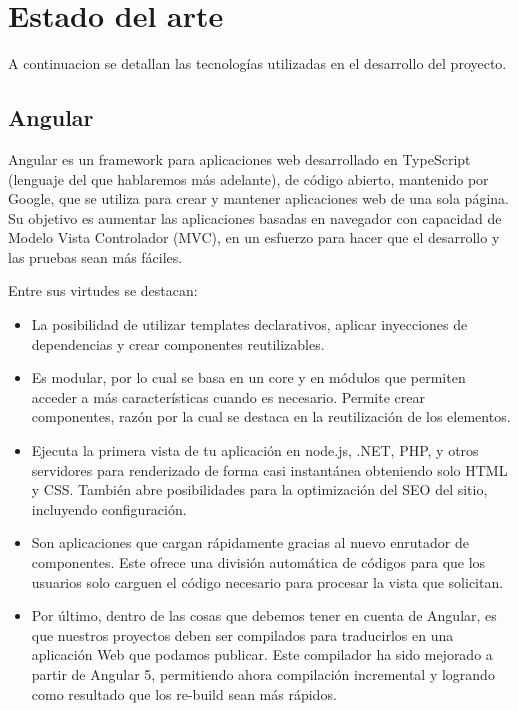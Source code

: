 \documentclass[a4paper, 12pt]{book}
\begin{document}

\cleardoublepage
\chapter{Estado del arte}
\label{chap:estado}

A continuacion se detallan las tecnologías utilizadas en el desarrollo del proyecto.



\section{Angular} 
\label{sec:Angular}
Angular es un framework para aplicaciones web desarrollado en TypeScript (lenguaje del que hablaremos más adelante), de código abierto, mantenido por Google, que se utiliza para crear y mantener aplicaciones web de una sola página. Su objetivo es aumentar las aplicaciones basadas en navegador con capacidad de Modelo Vista Controlador (MVC), en un esfuerzo para hacer que el desarrollo y las pruebas sean más fáciles.

Entre sus virtudes se destacan:
\begin{itemize}
\item La posibilidad de utilizar templates declarativos, aplicar inyecciones de dependencias y crear componentes reutilizables.

\item Es modular, por lo cual se basa en un core y en módulos que permiten acceder a más características cuando es necesario. Permite crear componentes, razón por la cual se destaca en la reutilización de los elementos.


\item Ejecuta la primera vista de tu aplicación en node.js, .NET, PHP, y otros servidores para renderizado de forma casi instantánea obteniendo solo HTML y CSS. También abre posibilidades para la optimización del SEO del sitio, incluyendo configuración.

\item Son aplicaciones que cargan rápidamente gracias al nuevo enrutador de componentes. Este ofrece una división automática de códigos para que los usuarios solo carguen el código necesario para procesar la vista que solicitan.

\item Por último, dentro de las cosas que debemos tener en cuenta de Angular, es que nuestros proyectos deben ser compilados para traducirlos en una aplicación Web que podamos publicar. Este compilador ha sido mejorado a partir de Angular 5, permitiendo ahora compilación incremental y logrando como resultado que los re-build sean más rápidos.
\end{itemize}
\end{document}

